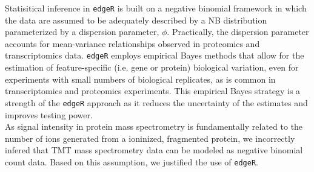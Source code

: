 \documentclass[11pt]{elife}\usepackage[]{graphicx}\usepackage[]{color}
\begin{document}




Statisitical inference in \texttt{edgeR} is built on a 
negative binomial framework in which the data are assumed to be 
adequately described by a NB distribution parameterized by a dispersion 
parameter, $\phi$. Practically, the dispersion parameter accounts for 
mean-variance relationships observed in proteomics and transcriptomics data. 
\texttt{edgeR} employs empirical Bayes methods that allow for the 
estimation of feature-specific (i.e. gene or protein) biological variation, 
even for experiments with small numbers of biological replicates, as is common 
in transcriptomics and proteomics experiments. This empirical Bayes strategy is 
a strength of the \texttt{edgeR} approach as it reduces the uncertainty of the 
estimates and improves testing power.\\

As signal intensity in protein mass spectrometry is fundamentally related to 
the number of ions generated from a ioninized, fragmented protein, we
incorrectly infered that TMT mass spectrometry data can be modeled as 
negative binomial count data. Based on this assumption, we justified the use of 
\texttt{edgeR}.\\
\end{document}
